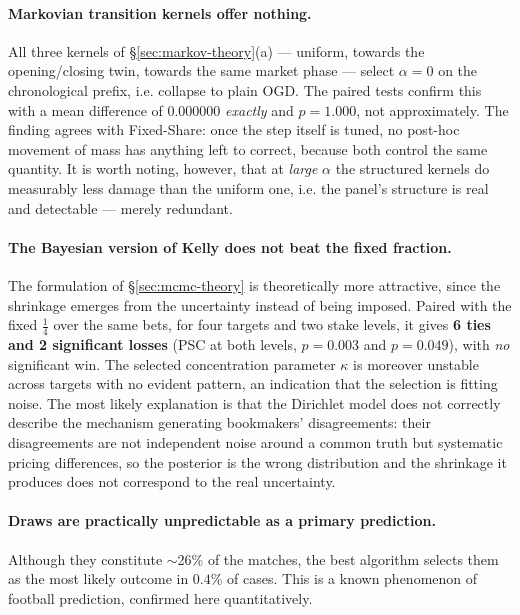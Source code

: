 \documentclass[12pt,a4paper,oneside]{report}
\renewcommand{\_}{\oldunderscore\allowbreak}
\theoremstyle{definition}
\theoremstyle{plain}
\theoremstyle{remark}
\begin{document}
\paragraph{Markovian transition kernels offer nothing.} All three kernels of
\S\ref{sec:markov-theory}(a) --- uniform, towards the opening/closing twin, towards the same
market phase --- select $\alpha = 0$ on the chronological prefix, i.e. collapse to plain OGD. The
paired tests confirm this with a mean difference of $0.000000$ \emph{exactly} and $p=1.000$, not
approximately. The finding agrees with Fixed-Share: once the step itself is tuned, no post-hoc
movement of mass has anything left to correct, because both control the same quantity. It is worth
noting, however, that at \emph{large} $\alpha$ the structured kernels do measurably less damage
than the uniform one, i.e. the panel's structure is real and detectable --- merely redundant.

\paragraph{The Bayesian version of Kelly does not beat the fixed fraction.} The formulation of
\S\ref{sec:mcmc-theory} is theoretically more attractive, since the shrinkage emerges from the
uncertainty instead of being imposed. Paired with the fixed $\tfrac14$ over the same bets, for
four targets and two stake levels, it gives \textbf{6 ties and 2 significant losses} (PSC at both
levels, $p=0.003$ and $p=0.049$), with \emph{no} significant win. The selected concentration
parameter $\kappa$ is moreover unstable across targets with no evident pattern, an indication that
the selection is fitting noise. The most likely explanation is that the Dirichlet model does not
correctly describe the mechanism generating bookmakers' disagreements: their disagreements are not
independent noise around a common truth but systematic pricing differences, so the posterior is
the wrong distribution and the shrinkage it produces does not correspond to the real uncertainty.

\paragraph{Draws are practically unpredictable as a primary prediction.} Although they constitute
$\sim$26\% of the matches, the best algorithm selects them as the most likely outcome in $0.4\%$
of cases. This is a known phenomenon of football prediction, confirmed here quantitatively.
\end{document}
